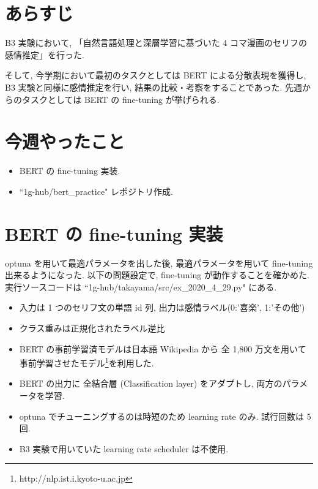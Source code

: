 \documentclass[twocolumn]{jarticle}     %
\begin{document}

\section{あらすじ}
B3 実験において, 「自然言語処理と深層学習に基づいた 4 コマ漫画のセリフの感情推定」を行った.

そして, 今学期において最初のタスクとしては BERT\cite{BERT} による分散表現を獲得し, B3 実験と同様に感情推定を行い, 結果の比較・考察をすることであった.
先週からのタスクとしては BERT の fine-tuning が挙げられる.

\section{今週やったこと}

\begin{itemize}
  \item BERT の fine-tuning 実装.
  \item ``1g-hub/bert\_practice" レポジトリ作成.
\end{itemize}

\section{BERT の fine-tuning 実装}
optuna を用いて最適パラメータを出した後, 最適パラメータを用いて fine-tuning 出来るようになった. 以下の問題設定で, fine-tuning が動作することを確かめた. 実行ソースコードは ``1g-hub/takayama/src/ex\_2020\_4\_29.py" にある.

\begin{itemize}
  \item 入力は 1 つのセリフ文の単語 id 列, 出力は感情ラベル(0:'喜楽', 1:'その他')
  \item クラス重みは正規化されたラベル逆比
  \item BERT の事前学習済モデルは日本語 Wikipedia から 全 1,800 万文を用いて事前学習させたモデル\footnote{http://nlp.ist.i.kyoto-u.ac.jp}を利用した.
  \item BERT の出力に 全結合層 (Classification layer) をアダプトし, 両方のパラメータを学習.
  \item optuna でチューニングするのは時短のため learning rate のみ. 試行回数は 5 回.
  \item B3 実験で用いていた learning rate scheduler は不使用.
\end{itemize}
\end{document}
